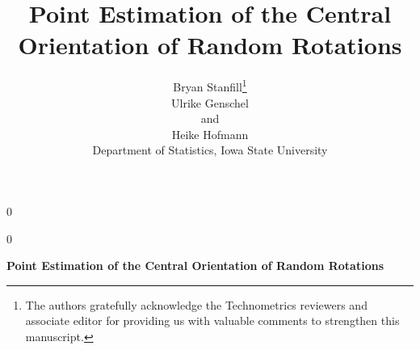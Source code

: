 \documentclass[12pt]{article}
\newcommand{\blind}{0}
\begin{document}
\def\spacingset#1{\renewcommand{\baselinestretch}%
{#1}\small\normalsize} \spacingset{1}

\blind
{
  \title{\bf Point Estimation of the Central Orientation of Random Rotations}
  \author{Bryan Stanfill\thanks{
    The authors gratefully acknowledge the Technometrics reviewers and associate editor for providing us with valuable comments to strengthen this manuscript.}\hspace{.2cm}\\
    Ulrike Genschel \\
    and\\
    Heike Hofmann\\
    Department of Statistics, Iowa State University\\}
  \maketitle
} \fi

\blind
{
  \bigskip
  \bigskip
  \bigskip
  \begin{center}
    {\LARGE\bf Point Estimation of the Central Orientation of Random Rotations}
\end{center}
  \medskip
} \fi

\end{document}

